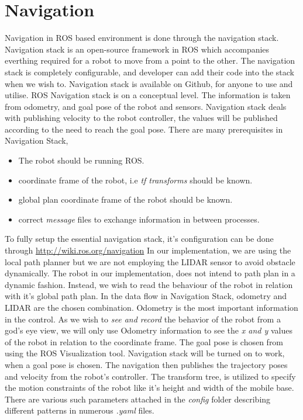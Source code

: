 \section{Navigation}
Navigation in ROS based environment is done through the navigation stack. Navigation stack is an open-source framework in ROS which accompanies everthing 
required for a robot to move from a point to the other. The navigation stack is completely configurable, and developer can add 
their code into the stack when we wish to. Navigation stack is available on Github, for anyone to use and utilise. 
ROS Navigation stack is on a conceptual level. The information is taken from odometry, and goal pose of the robot and sensors. 
Navigation stack deals with publishing velocity to the robot controller, the values will be published
according to the need to reach the goal pose. There are many prerequisites in Navigation Stack, 
\begin{itemize}
    \item The robot should be running ROS.
    \item coordinate frame of the robot, i.e \textit{tf transforms} should be known.
    \item global plan coordinate frame of the robot should be known.
    \item correct \textit{message} files to exchange information in between processes.
\end{itemize}
To fully setup the essential navigation stack, it's configuration can be done through \url{http://wiki.ros.org/navigation}
In our implementation, we are using the local path planner but we are not employing the LIDAR sensor to avoid obstacle dynamically.
The robot in our implementation, does not intend to path plan in a dynamic fashion. Instead, we wish to read the behaviour of the robot in relation with it's global path plan.
In the data flow in Navigation Stack, odometry and LIDAR are the chosen combination. Odometry is the most important information in the control.
As we wish to \textit{see and record} the behavior of the robot from a god's eye view, we will only use Odometry information to
see the \textit{x and y} values of the robot in relation to the coordinate frame. The goal pose is chosen from using the ROS Visualization tool.
Navigation stack will be turned on to work, when a goal pose is chosen. The navigation then publishes the trajectory poses and velocity from the 
robot's controller. The transform tree, is utilized to specify the motion constraints of the robot like it's height and width of the mobile base.
There are various such parameters attached in the \textit{config} folder describing different patterns in numerous \textit{.yaml} files.

